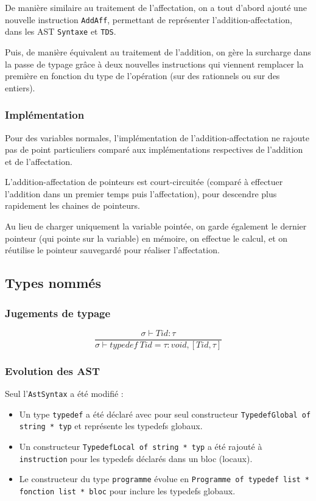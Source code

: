 \documentclass[headings=standardclasses,parskip=half]{scrartcl}
\begin{document}
De manière similaire au traitement de l'affectation, on a tout d'abord
ajouté une nouvelle instruction \texttt{AddAff}, permettant de
représenter l'addition-affectation, dans les AST \texttt{Syntaxe} et
\texttt{TDS}.

Puis, de manière équivalent au traitement de l'addition, on gère la
surcharge dans la passe de typage grâce à deux nouvelles instructions
qui viennent remplacer la première en fonction du type de l'opération
(sur des rationnels ou sur des entiers).

\subsubsection*{Implémentation}

Pour des variables normales, l'implémentation de l'addition-affectation
ne rajoute pas de point particuliers comparé aux implémentations
respectives de l'addition et de l'affectation.

L'addition-affectation de pointeurs est court-circuitée
(comparé à effectuer l'addition dans un premier temps
puis l'affectation), pour descendre plus rapidement les chaines
de pointeurs.

Au lieu de charger uniquement la variable pointée,
on garde également le dernier pointeur (qui pointe sur la variable)
en mémoire, on effectue le calcul, et on réutilise
le pointeur sauvegardé pour réaliser l'affectation.

\subsection{Types nommés}

\subsubsection*{Jugements de typage}

\[\frac{\sigma \vdash Tid : \tau}
    {\sigma \vdash typedef\ Tid = \tau : void, [Tid,\tau]}\]

\subsubsection*{Evolution des AST}

Seul l'\texttt{AstSyntax} a été modifié :

\begin{itemize}
    \item Un type \texttt{typedef} a été déclaré avec pour seul
          constructeur \texttt{TypedefGlobal of string * typ} et
          représente les typedefs globaux.
    \item Un constructeur \texttt{TypedefLocal of string * typ} a
          été rajouté à \texttt{instruction} pour les typedefs
          déclarés dans un bloc (locaux).
    \item Le constructeur du type \texttt{programme} évolue en
          \texttt{Programme of typedef list * fonction list * bloc}
          pour inclure les typedefs globaux.
\end{itemize}
\end{document}
